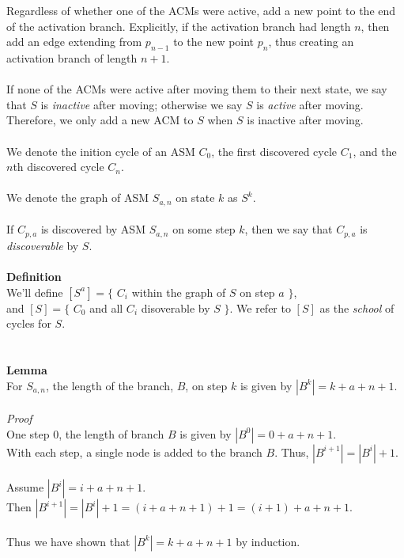 \documentclass[a4paper,12pt]{article}
\begin{document}
Regardless of whether one of the ACMs were active, add a new point to the end of the activation branch. Explicitly, if the activation branch had length $n$, then add an edge extending from $p_{n-1}$ to the new point $p_n$, thus creating an activation branch of length $n + 1$.\\
\\
If none of the ACMs were active after moving them to their next state, we say that $S$ is \textit{inactive} after moving; otherwise we say $S$ is \textit{active} after moving. Therefore, we only add a new ACM to $S$ when $S$ is inactive after moving.\\
\\
We denote the inition cycle of an ASM $C_0$, the first discovered cycle $C_1$, and the $n$th discovered cycle $C_n$.\\
\\
We denote the graph of ASM $S_{a,n}$ on state $k$ as $S^k$.\\
\\
If $C_{p,a}$ is discovered by ASM $S_{a,n}$ on some step $k$, then we say that $C_{p,a}$ is \textit{discoverable} by $S$.\\
\\
\textbf{Definition}\\  
We'll define $[S^a] = \{$ $C_i$ within the graph of $S$ on step $a$ $\}$,\\
and $[S] = \{$ $C_0$ and all $C_i$ disoverable by $S$ $\}$. We refer to $[S]$ as the \textit{school} of cycles for $S$.\\
\\
\\
\textbf{Lemma}\\
For $S_{a,n}$, the length of the branch, $B$, on step $k$ is given by $|B^k| = k + a + n + 1$.\\
\\
\textit{Proof}\\  
One step $0$, the length of branch $B$ is given by $|B^0| = 0 + a + n + 1$.\\
With each step, a single node is added to the branch $B$. Thus, $|B^{i+1}| = |B^{i}| + 1$.\\
\\
Assume $|B^{i}| = i + a + n + 1$.\\
Then $|B^{i+1}| = |B^{i}| + 1 = (i + a + n + 1) + 1 = (i + 1) + a + n + 1$.\\
\\
Thus we have shown that $|B^k| = k + a + n + 1$ by induction.\\
\end{document}

